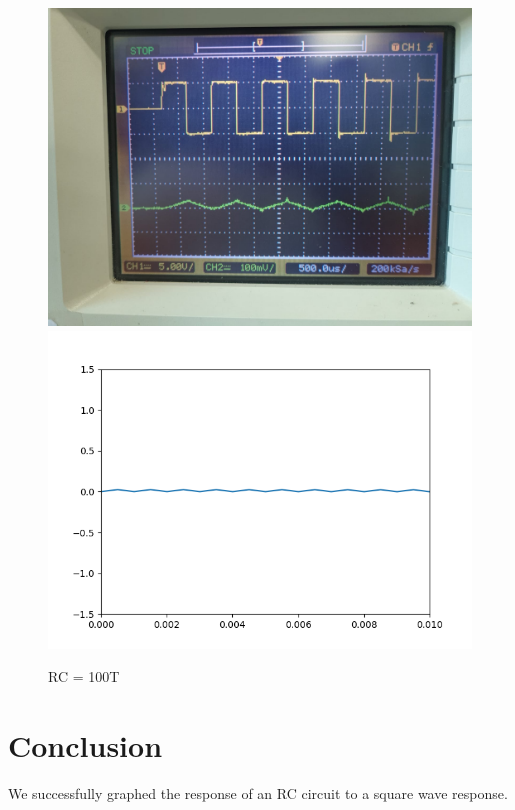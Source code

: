 \documentclass[a4paper,12pt]{article}
\begin{document}
\begin{figure}[!htb]
  {\includegraphics[width=0.5\columnwidth]{figs/RC=100T_exp.jpg}}
  \hspace{\fill}
  {\includegraphics[width=0.5\columnwidth]{figs/RC=100T_sim.png}}
  \caption{RC = 100T}
\end{figure}
	\section{Conclusion}
We successfully graphed the response of an RC circuit to a square wave response.
\end{document}
